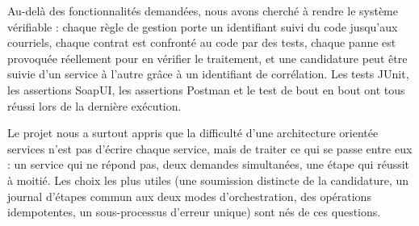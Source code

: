 Au-delà des fonctionnalités demandées, nous avons cherché à rendre le système vérifiable : chaque règle de gestion porte un identifiant suivi du code jusqu'aux courriels, chaque contrat est confronté au code par des tests, chaque panne est provoquée réellement pour en vérifier le traitement, et une candidature peut être suivie d'un service à l'autre grâce à un identifiant de corrélation. Les \nbJunit{} tests JUnit, les \nbSoapUI{} assertions SoapUI, les \nbPostman{} assertions Postman et le test de bout en bout ont tous réussi lors de la dernière exécution.

Le projet nous a surtout appris que la difficulté d'une architecture orientée services n'est pas d'écrire chaque service, mais de traiter ce qui se passe entre eux : un service qui ne répond pas, deux demandes simultanées, une étape qui réussit à moitié. Les choix les plus utiles (une soumission distincte de la candidature, un journal d'étapes commun aux deux modes d'orchestration, des opérations idempotentes, un sous-processus d'erreur unique) sont nés de ces questions.
